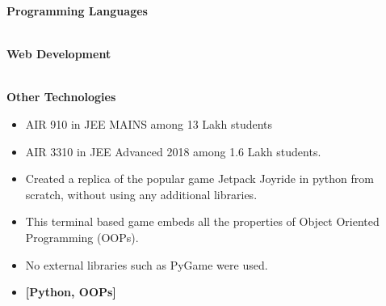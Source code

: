 \documentclass[10pt,a4paper,ragged2e,withhyper]{altacv}
\begin{document}
\begin{paracol}{2}

{\medium  \textbf{Programming Languages} }\\ \smallskip
{}


\divider\\

{\medium \textbf{Web Development}}\\ \smallskip
{}

\divider\\

{\medium \textbf{Other Technologies} }\\ \smallskip
{}



\begin{itemize}
    \item AIR 910 in JEE MAINS among 13 Lakh students
    \item AIR 3310 in JEE Advanced 2018 among 1.6 Lakh students.
\end{itemize}



\switchcolumn



\textbf{}
    \begin{itemize}
    
    \item Created a replica of the popular game Jetpack Joyride in python from scratch, without using any additional libraries.
    \item This terminal based game embeds all the properties of Object Oriented Programming (OOPs).
    \item No external libraries such as PyGame were used. 
    \item \textbf{[Python, OOPs]}
\end{itemize}
\divider


\end{paracol}
\end{document}
